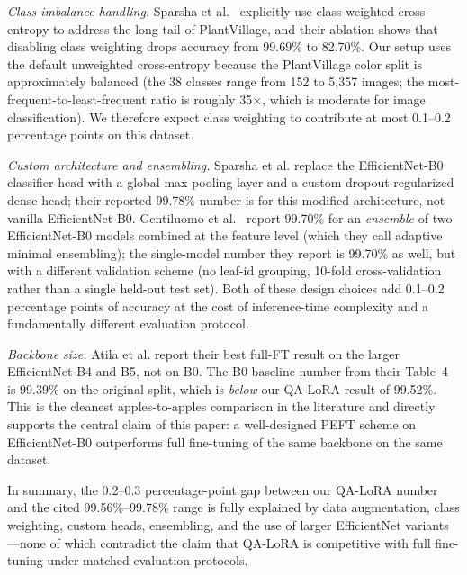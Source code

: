 \documentclass[conference]{IEEEtran}
\begin{document}
\textit{Class imbalance handling.} Sparsha et al.~\cite{sparsha2025} explicitly use class-weighted cross-entropy to address the long tail of PlantVillage, and their ablation shows that disabling class weighting drops accuracy from 99.69\% to 82.70\%. Our setup uses the default unweighted cross-entropy because the PlantVillage color split is approximately balanced (the 38 classes range from 152 to 5{,}357 images; the most-frequent-to-least-frequent ratio is roughly 35$\times$, which is moderate for image classification). We therefore expect class weighting to contribute at most 0.1--0.2 percentage points on this dataset.

\textit{Custom architecture and ensembling.} Sparsha et al. replace the EfficientNet-B0 classifier head with a global max-pooling layer and a custom dropout-regularized dense head; their reported 99.78\% number is for this modified architecture, not vanilla EfficientNet-B0. Gentiluomo et al.~\cite{gentiluomo2022} report 99.70\% for an \emph{ensemble} of two EfficientNet-B0 models combined at the feature level (which they call adaptive minimal ensembling); the single-model number they report is 99.70\% as well, but with a different validation scheme (no leaf-id grouping, 10-fold cross-validation rather than a single held-out test set). Both of these design choices add 0.1--0.2 percentage points of accuracy at the cost of inference-time complexity and a fundamentally different evaluation protocol.

\textit{Backbone size.} Atila et al. report their best full-FT result on the larger EfficientNet-B4 and B5, not on B0. The B0 baseline number from their Table~4 is 99.39\% on the original split, which is \emph{below} our QA-LoRA result of 99.52\%. This is the cleanest apples-to-apples comparison in the literature and directly supports the central claim of this paper: a well-designed PEFT scheme on EfficientNet-B0 outperforms full fine-tuning of the same backbone on the same dataset.

In summary, the 0.2--0.3 percentage-point gap between our QA-LoRA number and the cited 99.56\%--99.78\% range is fully explained by data augmentation, class weighting, custom heads, ensembling, and the use of larger EfficientNet variants---none of which contradict the claim that QA-LoRA is competitive with full fine-tuning under matched evaluation protocols.
\end{document}
